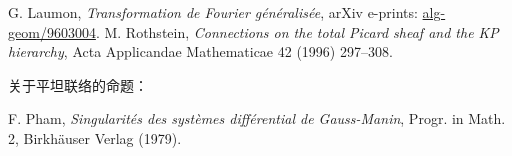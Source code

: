 \begin{references}
 G. Laumon, \emph{Transformation de Fourier généralisée}, arXiv e-prints: \href{https://arxiv.org/abs/alg-geom/9603004}{alg-geom/9603004}.
 M. Rothstein, \emph{Connections on the total Picard sheaf and the KP hierarchy}, Acta Applicandae Mathematicae 42 (1996) 297--308.
\end{references}
关于平坦联络的命题：
\begin{references}
 F. Pham, \emph{Singularités des systèmes différential de Gauss-Manin}, Progr. in Math. 2, Birkhäuser Verlag (1979).
\end{references}
